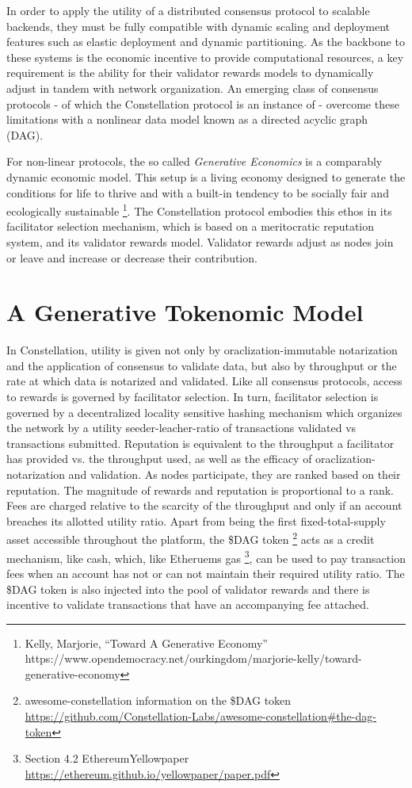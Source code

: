 \documentclass{article}
\begin{document}
In order to apply the utility of a distributed consensus protocol to scalable backends, they must be fully compatible with dynamic scaling and deployment features such as elastic deployment and dynamic partitioning. As the backbone to these systems is the economic incentive to provide computational resources, a key requirement is the ability for their validator rewards models to dynamically adjust in tandem with network organization. An emerging class of consensus protocols - of which the Constellation protocol is an instance of - overcome these limitations with a nonlinear data model known as a directed acyclic graph (DAG).

For non-linear protocols, the so called {\emph{Generative Economics}} is a comparably dynamic economic model. This setup is a living economy designed to generate the conditions for life to thrive and with a built-in tendency to be socially fair and ecologically sustainable
\footnote{Kelly, Marjorie, ``Toward A Generative Economy'' \\ https://www.opendemocracy.net/ourkingdom/marjorie-kelly/toward-generative-economy}. 
The Constellation protocol embodies this ethos in its facilitator selection mechanism, which is based on a meritocratic reputation system, and its validator rewards model. Validator rewards adjust as nodes join or leave and increase or decrease their contribution.

\section{A Generative Tokenomic Model}
In Constellation, utility is given not only by oraclization-immutable notarization and the application of consensus to validate data, but also by throughput or the rate at which data is notarized and validated. Like all consensus protocols, access to rewards is governed by facilitator selection. In turn, facilitator selection is governed by a decentralized locality sensitive hashing mechanism which organizes the network by a utility seeder-leacher-ratio of transactions validated vs transactions submitted. Reputation is equivalent to the throughput a facilitator has provided vs. the throughput used, as well as the efficacy of oraclization-notarization and validation. As nodes participate, they are ranked based on their reputation. The magnitude of rewards and reputation is proportional to a rank. Fees are charged relative to the scarcity of the throughput and only if an account breaches its allotted utility ratio. Apart from being the first fixed-total-supply asset accessible throughout the platform, the \$DAG token 
\footnote{awesome-constellation information on the \$DAG token\\ \url{https://github.com/Constellation-Labs/awesome-constellation\#the-dag-token}} 
acts as a credit mechanism, like cash, which, like Etheruems gas
\footnote{Section 4.2 EthereumYellowpaper\\ \url{https://ethereum.github.io/yellowpaper/paper.pdf}}, 
can be used to pay transaction fees when an account has not or can not maintain their required utility ratio. 
The \$DAG token is also injected into the pool of validator rewards and there is incentive to validate transactions that have an accompanying fee attached. 
\end{document}
